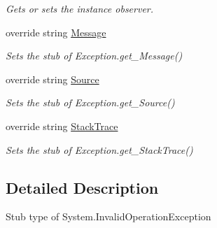\begin{DoxyCompactItemize}
\begin{DoxyCompactList}\small\item\em Gets or sets the instance observer.\end{DoxyCompactList}\item 
override string \hyperlink{class_system_1_1_fakes_1_1_stub_invalid_operation_exception_a874c9541edb366cb15bcda28e1be1ded}{Message}
\begin{DoxyCompactList}\small\item\em Sets the stub of Exception.\-get\-\_\-\-Message()\end{DoxyCompactList}\item 
override string \hyperlink{class_system_1_1_fakes_1_1_stub_invalid_operation_exception_a01bff8a7ff7aba65094e0d033f0f1834}{Source}
\begin{DoxyCompactList}\small\item\em Sets the stub of Exception.\-get\-\_\-\-Source()\end{DoxyCompactList}\item 
override string \hyperlink{class_system_1_1_fakes_1_1_stub_invalid_operation_exception_ae891a709eadf25283e5bf129a778da4f}{Stack\-Trace}
\begin{DoxyCompactList}\small\item\em Sets the stub of Exception.\-get\-\_\-\-Stack\-Trace()\end{DoxyCompactList}\end{DoxyCompactItemize}


\subsection{Detailed Description}
Stub type of System.\-Invalid\-Operation\-Exception



